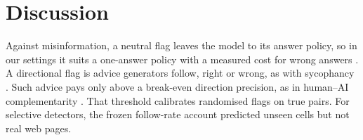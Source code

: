 \section{Discussion}
\label{sec:discussion}

Against misinformation, a neutral flag leaves the model to its answer policy, so in our settings it suits a one-answer
policy with a measured cost for wrong answers \citep{wen2025abstention}. A directional flag is advice generators follow, right or
wrong, as with sycophancy \citep{sharma2024sycophancy}. Such advice pays only above a break-even direction precision, as in
human--AI complementarity \citep{bansal2021accurate,mozannar2020defer}. That threshold calibrates randomised flags on
true pairs. For selective detectors, the frozen follow-rate account predicted unseen cells but not real web pages.
